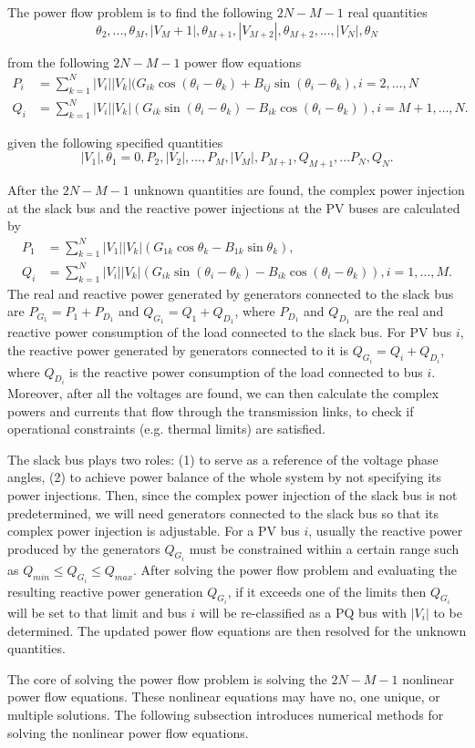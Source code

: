 The power flow problem is to find the following $2N - M - 1$ real quantities 
\[\theta_2,...,\theta_M,|V_M+1|,\theta_{M+1},|V_{M+2}|,\theta_{M+2},...,|V_N|,\theta_N\]

from the following $2N - M - 1$ power flow equations
\begin{align}
P_i&=\sum_{k=1}^N |V_i||V_k|(G_{ik}\cos{(\theta_i-\theta_k)}+B_{ij}\sin{(\theta_i-\theta_k)}, i=2,\dots,N\\
Q_i &=\sum_{k=1}^N|V_i||V_k|(G_{ik}\sin{(\theta_i-\theta_k)}-B_{ik}\cos{(\theta_i-\theta_k)}), i=M+1,\dots,N. 
\end{align}

given the following specified quantities
\[|V_1|,\theta_1 = 0,P_2,|V_2|,...,P_M,|V_M|,P_{M+1},Q_{M+1},...P_N,Q_N.\]


 After the $2N - M - 1$ unknown quantities are found, the complex power injection at the slack bus and the reactive power injections at the PV buses are calculated by
\begin{align}
P_1 &=\sum_{k=1}^N |V_1||V_k|(G_{1k}\cos{\theta_k} -B_{1k}\sin{\theta_k}),\\
Q_i &=\sum_{k=1}^N|V_i| |V_k| (G_{ik}\sin{(\theta_i-\theta_k)}-B_{ik}\cos{(\theta_i-\theta_k)}), i=1,\dots,M.
\end{align}
The real and reactive power generated by generators connected to the slack bus are $P_{G_1} = P_1 +P_{D_1}$ and $Q_{G_1} = Q_1 +Q_{D_1}$, where $P_{D_1}$ and $Q_{D_1}$ are the real and reactive power consumption of the load connected to the slack bus. For PV bus $i$, the reactive power generated by generators connected to it is $Q_{G_i} = Q_i + Q_{D_i}$, where $Q_{D_i}$ is the reactive power consumption of the load connected to bus $i$. Moreover, after all the voltages are found, we can then calculate the complex powers and currents that flow through the transmission links, to check if operational constraints (e.g. thermal limits) are satisfied.


\begin{remark}The slack bus plays two roles: (1) to serve as a reference of the voltage phase angles, (2) to achieve power balance of the whole system by not specifying its power injections. Then, since the complex power injection of the slack bus is not predetermined, we will need generators connected to the slack bus so that its complex power injection is adjustable. For a PV bus $i$, usually the reactive power produced by the generators $Q_{G_i}$ must be constrained within a certain range such as $Q_{min} \leq Q_{G_i} \leq Q_{max}$. After solving
the power flow problem and evaluating the resulting reactive power generation $Q_{G_i}$, if it exceeds one of the limits then $Q_{G_i}$ will be set to that limit and bus $i$ will be re-classified as a PQ bus with $|V_i|$ to be determined. The updated power flow equations are then resolved for the unknown quantities.

\end{remark}
The core of solving the power flow problem is solving the $2N - M - 1$ nonlinear power flow equations. These nonlinear equations may have no, one unique, or multiple solutions. The following subsection introduces numerical methods for solving the nonlinear power flow equations.


